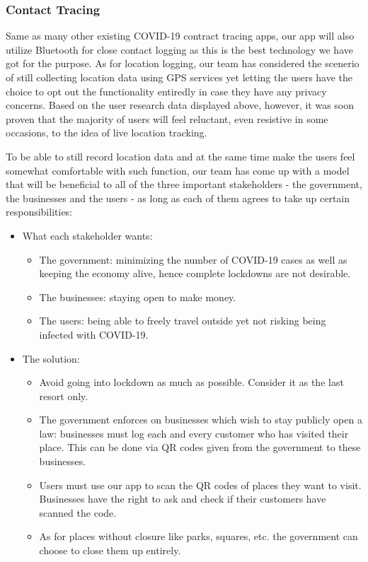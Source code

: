   \subsubsection{Contact Tracing}
  \par Same as many other existing COVID-19 contract tracing apps, our app will also utilize Bluetooth for close contact logging as this is the best technology we have got for the purpose. As for location logging, our team has considered the scenerio of still collecting location data using GPS services yet letting the users have the choice to opt out the functionality entiredly in case they have any privacy concerns. Based on the user research data displayed above, however, it was soon proven that the majority of users will feel reluctant, even resistive in some occasions, to the idea of live location tracking.
  \par To be able to still record location data and at the same time make the users feel somewhat comfortable with such function, our team has come up with a model that will be beneficial to all of the three important stakeholders - the government, the businesses and the users - as long as each of them agrees to take up certain responsibilities:
  \begin{itemize}
    \item What each stakeholder wants:
      \begin{itemize}
        \item The government: minimizing the number of COVID-19 cases as well as keeping the economy alive, hence complete lockdowns are not desirable.
        \item The businesses: staying open to make money.
        \item The users: being able to freely travel outside yet not risking being infected with COVID-19.
      \end{itemize}
    \item The solution:
      \begin{itemize}
        \item Avoid going into lockdown as much as possible. Consider it as the last resort only.
        \item The government enforces on businesses which wish to stay publicly open a law: businesses must log each and every customer who has visited their place. This can be done via QR codes given from the government to these businesses.
        \item Users must use our app to scan the QR codes of places they want to visit. Businesses have the right to ask and check if their customers have scanned the code. 
        \item As for places without closure like parks, squares, etc. the government can choose to close them up entirely.
      \end{itemize}
  \end{itemize}
